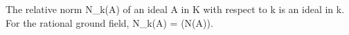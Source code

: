 The relative norm N_k(A) of an ideal A in K with respect to k is an ideal in k. For the rational ground field, N_k(A) = (N(A)).
